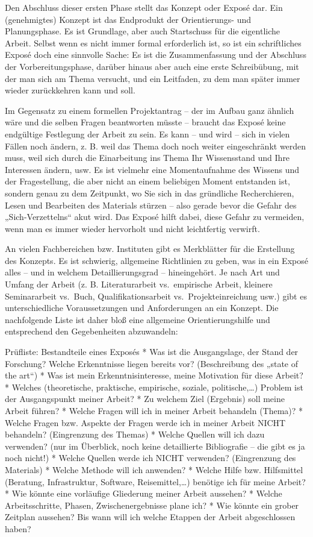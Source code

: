\documentclass[]{article}
\begin{document}
Den Abschluss dieser ersten Phase stellt das Konzept oder Exposé dar.
Ein (genehmigtes) Konzept ist das Endprodukt der Orientierungs- und
Planungsphase. Es ist Grundlage, aber auch Startschuss für die
eigentliche Arbeit. Selbst wenn es nicht immer formal erforderlich ist,
so ist ein schriftliches Exposé doch eine sinnvolle Sache: Es ist die
Zusammenfassung und der Abschluss der Vorbereitungsphase, darüber hinaus
aber auch eine erste Schreibübung, mit der man sich am Thema versucht,
und ein Leitfaden, zu dem man später immer wieder zurückkehren kann und
soll.

Im Gegensatz zu einem formellen Projektantrag -- der im Aufbau ganz
ähnlich wäre und die selben Fragen beantworten müsste -- braucht das
Exposé keine endgültige Festlegung der Arbeit zu sein. Es kann -- und
wird -- sich in vielen Fällen noch ändern, z. B. weil das Thema doch
noch weiter eingeschränkt werden muss, weil sich durch die Einarbeitung
ins Thema Ihr Wissensstand und Ihre Interessen ändern, usw. Es ist
vielmehr eine Momentaufnahme des Wissens und der Fragestellung, die aber
nicht an einem beliebigen Moment entstanden ist, sondern genau zu dem
Zeitpunkt, wo Sie sich in das gründliche Recherchieren, Lesen und
Bearbeiten des Materials stürzen -- also gerade bevor die Gefahr des
„Sich-Verzettelns`` akut wird. Das Exposé hilft dabei, diese Gefahr zu
vermeiden, wenn man es immer wieder hervorholt und nicht leichtfertig
verwirft.

An vielen Fachbereichen bzw. Instituten gibt es Merkblätter für die
Erstellung des Konzepts. Es ist schwierig, allgemeine Richtlinien zu
geben, was in ein Exposé alles -- und in welchem Detaillierungsgrad --
hineingehört. Je nach Art und Umfang der Arbeit (z. B. Literaturarbeit
vs.~empirische Arbeit, kleinere Seminararbeit vs.~Buch,
Qualifikationsarbeit vs.~Projekteinreichung usw.) gibt es
unterschiedliche Voraussetzungen und Anforderungen an ein Konzept. Die
nachfolgende Liste ist daher bloß eine allgemeine Orientierungshilfe und
entsprechend den Gegebenheiten abzuwandeln:

Prüfliste: Bestandteile eines Exposés * Was ist die Ausgangslage, der
Stand der Forschung? Welche Erkenntnisse liegen bereits vor?
(Beschreibung des „state of the art``) * Was ist mein
Erkenntnisinteresse, meine Motivation für diese Arbeit? * Welches
(theoretische, praktische, empirische, soziale, politische,\ldots{})
Problem ist der Ausgangspunkt meiner Arbeit? * Zu welchem Ziel
(Ergebnis) soll meine Arbeit führen? * Welche Fragen will ich in meiner
Arbeit behandeln (Thema)? * Welche Fragen bzw. Aspekte der Fragen werde
ich in meiner Arbeit NICHT behandeln? (Eingrenzung des Themas) * Welche
Quellen will ich dazu verwenden? (nur im Überblick, noch keine
detaillierte Bibliografie -- die gibt es ja noch nicht!) * Welche
Quellen werde ich NICHT verwenden? (Eingrenzung des Materials) * Welche
Methode will ich anwenden? * Welche Hilfe bzw. Hilfsmittel (Beratung,
Infrastruktur, Software, Reisemittel,\ldots{}) benötige ich für meine
Arbeit? * Wie könnte eine vorläufige Gliederung meiner Arbeit aussehen?
* Welche Arbeitsschritte, Phasen, Zwischenergebnisse plane ich? * Wie
könnte ein grober Zeitplan aussehen? Bis wann will ich welche Etappen
der Arbeit abgeschlossen haben?
\end{document}
